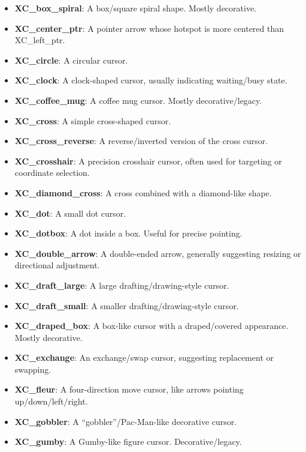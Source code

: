 \documentclass{report}
\begin{document}
\begin{itemize}
\begin{itemize}
                    \item \textbf{XC\_box\_spiral}:	A box/square spiral shape. Mostly decorative.
                    \item \textbf{XC\_center\_ptr}:	A pointer arrow whose hotspot is more centered than XC\_left\_ptr.
                    \item \textbf{XC\_circle}:	A circular cursor.
                    \item \textbf{XC\_clock}:	A clock-shaped cursor, usually indicating waiting/busy state.
                    \item \textbf{XC\_coffee\_mug}:	A coffee mug cursor. Mostly decorative/legacy.
                    \item \textbf{XC\_cross}:	A simple cross-shaped cursor.
                    \item \textbf{XC\_cross\_reverse}:	A reverse/inverted version of the cross cursor.
                    \item \textbf{XC\_crosshair}:	A precision crosshair cursor, often used for targeting or coordinate selection.
                    \item \textbf{XC\_diamond\_cross}:	A cross combined with a diamond-like shape.
                    \item \textbf{XC\_dot}:	A small dot cursor.
                    \item \textbf{XC\_dotbox}:	A dot inside a box. Useful for precise pointing.
                    \item \textbf{XC\_double\_arrow}:	A double-ended arrow, generally suggesting resizing or directional adjustment.
                    \item \textbf{XC\_draft\_large}:	A large drafting/drawing-style cursor.
                    \item \textbf{XC\_draft\_small}:	A smaller drafting/drawing-style cursor.
                    \item \textbf{XC\_draped\_box}:	A box-like cursor with a draped/covered appearance. Mostly decorative.
                    \item \textbf{XC\_exchange}:	An exchange/swap cursor, suggesting replacement or swapping.
                    \item \textbf{XC\_fleur}:	A four-direction move cursor, like arrows pointing up/down/left/right.
                    \item \textbf{XC\_gobbler}:	A “gobbler”/Pac-Man-like decorative cursor.
                    \item \textbf{XC\_gumby}:	A Gumby-like figure cursor. Decorative/legacy.

\end{itemize}
\end{itemize}
\end{document}
